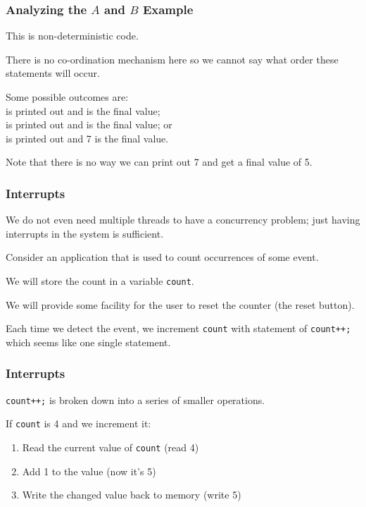 \begin{frame}
\frametitle{Analyzing the $A$ and $B$ Example}

This is non-deterministic code. 

There is no co-ordination mechanism here so we cannot say what order these statements will occur. 

Some possible outcomes are:\\
 is printed out and is the final value;\\
 is printed out and is the final value; or\\
 is printed out and 7 is the final value. 

Note that there is no way we can print out 7 and get a final value of 5.


\end{frame}

\begin{frame}
\frametitle{Interrupts}

We do not even need multiple threads to have a concurrency problem; just having interrupts in the system is sufficient.

Consider an application that is used to count occurrences of some event. 

We will store the count in a variable \texttt{count}.

We will provide some facility for the user to reset the counter (the reset button). 

Each time we detect the event, we increment \texttt{count} with statement of \texttt{count++;} which seems like one single statement.



\end{frame}

\begin{frame}
\frametitle{Interrupts}

\texttt{count++;} is broken down into a series of smaller operations.

If \texttt{count} is 4 and we increment it:

\begin{enumerate}
	\item Read the current value of \texttt{count} (read 4)
	\item Add 1 to the value (now it's 5)
	\item Write the changed value back to memory (write 5)
\end{enumerate}


\end{frame}

